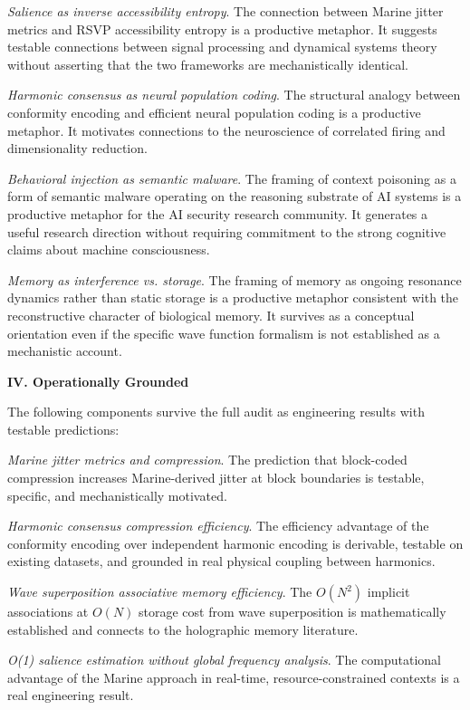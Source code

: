 \textit{Salience as inverse accessibility entropy}.
The connection between Marine jitter metrics and RSVP
accessibility entropy is a productive metaphor. It
suggests testable connections between signal processing
and dynamical systems theory without asserting that
the two frameworks are mechanistically identical.

\textit{Harmonic consensus as neural population coding}.
The structural analogy between \HCFone{} conformity
encoding and efficient neural population coding is a
productive metaphor. It motivates connections to the
neuroscience of correlated firing and dimensionality
reduction.

\textit{Behavioral injection as semantic malware}.
The framing of context poisoning as a form of semantic
malware operating on the reasoning substrate of AI
systems is a productive metaphor for the AI security
research community. It generates a useful research
direction without requiring commitment to the strong
cognitive claims about machine consciousness.

\textit{Memory as interference vs. storage}. The
\MEMeight{} framing of memory as ongoing resonance
dynamics rather than static storage is a productive
metaphor consistent with the reconstructive character
of biological memory. It survives as a conceptual
orientation even if the specific wave function
formalism is not established as a mechanistic account.

\bigskip
\noindent\textbf{IV. Operationally Grounded}

\medskip

The following components survive the full audit as
\LevelI{} engineering results with testable predictions:

\textit{Marine jitter metrics and compression}.
The prediction that block-coded compression increases
Marine-derived jitter at block boundaries is testable,
specific, and mechanistically motivated.

\textit{Harmonic consensus compression efficiency}.
The efficiency advantage of the conformity encoding
over independent harmonic encoding is derivable,
testable on existing datasets, and grounded in real
physical coupling between harmonics.

\textit{Wave superposition associative memory efficiency}.
The $O(N^2)$ implicit associations at $O(N)$ storage
cost from wave superposition is mathematically established
and connects to the holographic memory literature.

\textit{O(1) salience estimation without global frequency
analysis}. The computational advantage of the Marine
approach in real-time, resource-constrained contexts
is a real engineering result.

